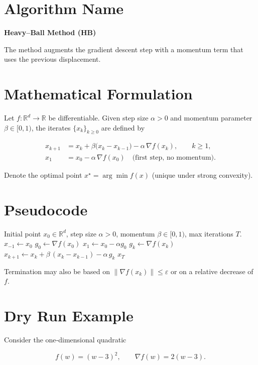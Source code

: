 \documentclass{article}
\newcommand{\R}{\mathbb{R}}
\newcommand{\norm}[1]{\left\lVert#1\right\rVert}
\begin{document}
\section*{Algorithm Name}
\textbf{Heavy–Ball Method (HB)}  

The method augments the gradient descent step with a momentum term that uses the previous displacement.

\section*{Mathematical Formulation}
Let $f:\R^{d}\rightarrow\R$ be differentiable.  
Given step size $\alpha>0$ and momentum parameter $\beta\in[0,1)$, the iterates $\{x_k\}_{k\ge 0}$ are defined by  

\[
\boxed{
\begin{aligned}
x_{k+1}&=x_k+\beta\bigl(x_k-x_{k-1}\bigr)-\alpha\,\nabla f(x_k),\qquad k\ge 1,\\[2mm]
x_1&=x_0-\alpha\,\nabla f(x_0) \quad\text{(first step, no momentum).}
\end{aligned}}
\]

Denote the optimal point $x^{\star}=\arg\min f(x)$ (unique under strong convexity).

\section*{Pseudocode}
\begin{algorithm}[H]
\caption{Heavy–Ball Method}
\begin{algorithmic}[1]
\Require Initial point $x_0\in\R^{d}$, step size $\alpha>0$, momentum $\beta\in[0,1)$, max iterations $T$.
\State $x_{-1}\gets x_0$ 
\State $g_0\gets \nabla f(x_0)$
\State $x_1\gets x_0-\alpha g_0$
    \State $g_k\gets \nabla f(x_k)$
    \State $x_{k+1}\gets x_k+\beta\,(x_k-x_{k-1})-\alpha\,g_k$
\EndFor
\State \Return $x_T$
\end{algorithmic}
\end{algorithm}

Termination may also be based on $\norm{\nabla f(x_k)}\le\varepsilon$ or on a relative decrease of $f$.

\section*{Dry Run Example}
Consider the one‑dimensional quadratic  

\[
f(w)=(w-3)^2,\qquad \nabla f(w)=2(w-3).
\]
\end{document}
